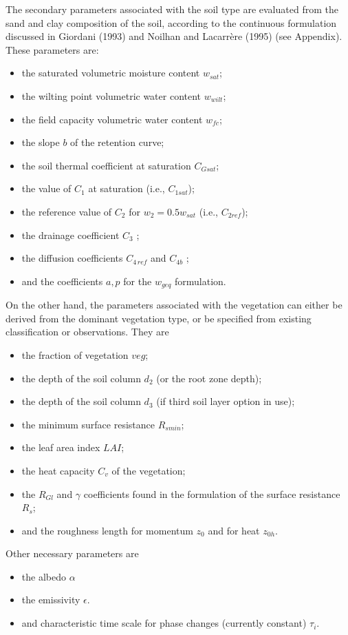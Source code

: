 {The secondary parameters associated with the soil type are
evaluated from the sand and clay composition of the soil, according
to the continuous formulation discussed in Giordani (1993) and
Noilhan and Lacarr\`{e}re (1995) (see Appendix).
These parameters are:
\begin{itemize}
\item the saturated volumetric moisture content $w_{sat}$;
\item the wilting point volumetric water content $w_{wilt}$;
\item the field capacity volumetric water content $w_{fc}$;
\item the slope $b$ of the retention curve;
\item the soil thermal coefficient at saturation $C_{Gsat}$;
\item the value of $C_1$ at saturation (i.e., $C_{1sat}$);
\item the reference value of $C_2$ for $w_2=0.5 w_{sat}$ (i.e., $C_{2ref}$);
\item the drainage coefficient $C_3$  ;
\item the diffusion coefficients $C_{4\,ref}$ and $C_{4b}$ ;
\item and the coefficients $a,p$ for the $w_{geq}$ formulation.
\end{itemize}
On the other hand,
the parameters associated with the vegetation can either
be derived from the dominant vegetation type, or
be specified from existing classification or observations.
They are
\begin{itemize}
\item the fraction of vegetation $veg$;
\item the depth of the soil column $d_2$ (or the root zone depth);
\item the depth of the soil column $d_3$ (if third soil layer option in use);
\item the minimum surface resistance $R_{smin}$;
\item the leaf area index $LAI$;
\item the heat capacity $C_v$ of the vegetation;
\item the $R_{Gl}$ and $\gamma$ coefficients found in the formulation
of the surface resistance $R_s$;
\item and the roughness length for momentum $z_0$ and for heat $z_{0h}$.
\end{itemize}
Other necessary parameters are
\begin{itemize}
\item the albedo $\alpha$
\item the emissivity $\epsilon$.
\item and characteristic time scale for phase changes (currently constant) $\tau_i$.
\end{itemize}


}
